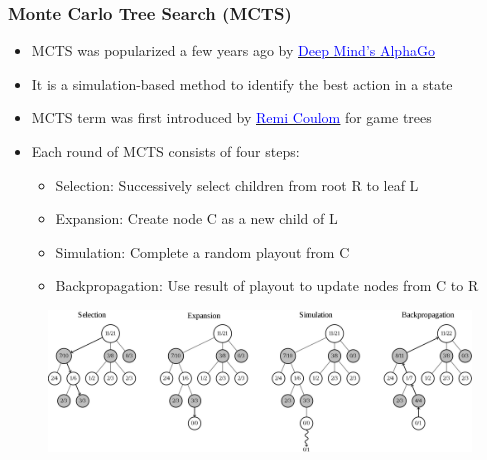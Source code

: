 \documentclass[handout]{beamer}
\begin{document}
\begin{frame}
\frametitle{Monte Carlo Tree Search (MCTS)}
\pause
\begin{itemize}[<+->]
\item MCTS was popularized a few years ago by \href{https://www.nature.com/articles/nature16961}{\underline{\textcolor{blue}{Deep Mind's AlphaGo}}}
\item It is a simulation-based method to identify the best action in a state
\item MCTS term was first introduced by \href{https://hal.inria.fr/inria-00116992/document}{\underline{\textcolor{blue}{Remi Coulom}}} for game trees
\item Each round of MCTS consists of four steps:
\begin{itemize}
\item Selection: Successively select children from root R to leaf L
\item Expansion: Create node C as a new child of L
\item Simulation: Complete a random playout from C
\item Backpropagation: Use result of playout to update nodes from C to R
\end{itemize}
\end{itemize}
\begin{figure}
\includegraphics[scale=0.115]{MCTS.png}
\end{figure}
\end{frame}
\end{document}
